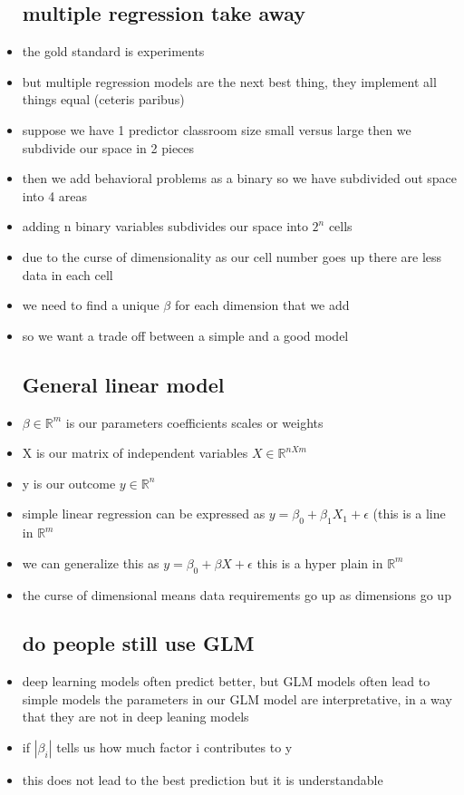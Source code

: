 \documentclass{article}
\begin{document}
\begin{itemize}
\subsection{multiple regression take away}
\item the gold standard is experiments 
\item but multiple regression models are the next best thing, they implement all things equal (ceteris paribus) 
\item suppose we have 1 predictor classroom size small versus large then we subdivide our space in 2 pieces
\item then we add behavioral problems as a binary so we have subdivided out space into 4 areas
\item adding n binary variables subdivides our space into $2^n$ cells
\item due to the curse of dimensionality as our cell number goes up there are less data in each cell 
\item we need to find a unique $\beta$ for each dimension that we add
\item so we want a trade off between a simple and a good model 
\subsection{General linear model}
\item $\beta\in \mathbb{R}^m$ is our parameters coefficients scales or weights
\item X is our matrix of independent variables $X\in \mathbb{R}^{nXm}$
\item y is our outcome $y\in\mathbb{R}^n$
\item simple linear regression can be expressed as $y=\beta_0+\beta_1X_1+\epsilon$ (this is a line in $\mathbb{R}^m$
\item we can generalize this as $y=\beta_0+\beta X +\epsilon$ this is a hyper plain in $\mathbb{R}^m$
\item the curse of dimensional means data requirements go up as dimensions go up 
\subsection{do people still use GLM}
\item deep learning models often predict better, but GLM models often lead to simple models
\itme the parameters in our GLM model are interpretative, in a way that they are not in deep leaning models
\item if $|\beta_i|$ tells us how much factor i contributes to y 
\item this does not lead to the best prediction  but it is understandable

\end{itemize}
\end{document}
